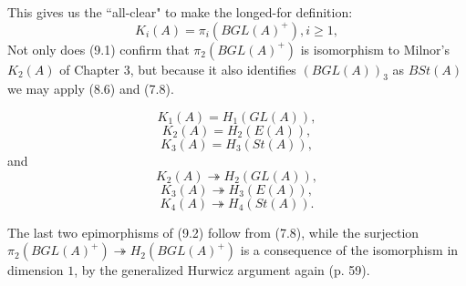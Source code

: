 This gives us the ``all-clear" to make the longed-for definition:
\[K_i(A)=\pi_i(BGL(A)^+), i\geqslant 1,\]
Not only does (9.1) confirm that $\pi_2(BGL(A)^+)$ is isomorphism to Milnor's $K_2(A)$ of Chapter 3, but because it also identifies $(BGL(A))_3$ as $BSt(A)$ we may apply (8.6) and (7.8).
\begin{theorem}
  \[K_1(A)=H_1(GL(A)),\]
  \[K_2(A)=H_2(E(A)),\]
  \[K_3(A)=H_3(St(A)),\]
  and
  \[K_2(A)\twoheadrightarrow H_2(GL(A)),\]
  \[K_3(A)\twoheadrightarrow H_3(E(A)),\]
  \[K_4(A)\twoheadrightarrow H_4(St(A)).\]
\end{theorem}
The last two epimorphisms of (9.2) follow from (7.8), while the surjection $\pi_2(BGL(A)^+)\twoheadrightarrow H_2(BGL(A)^+)$ is a consequence of the isomorphism in dimension $1$, by the generalized Hurwicz argument again (p. 59).

